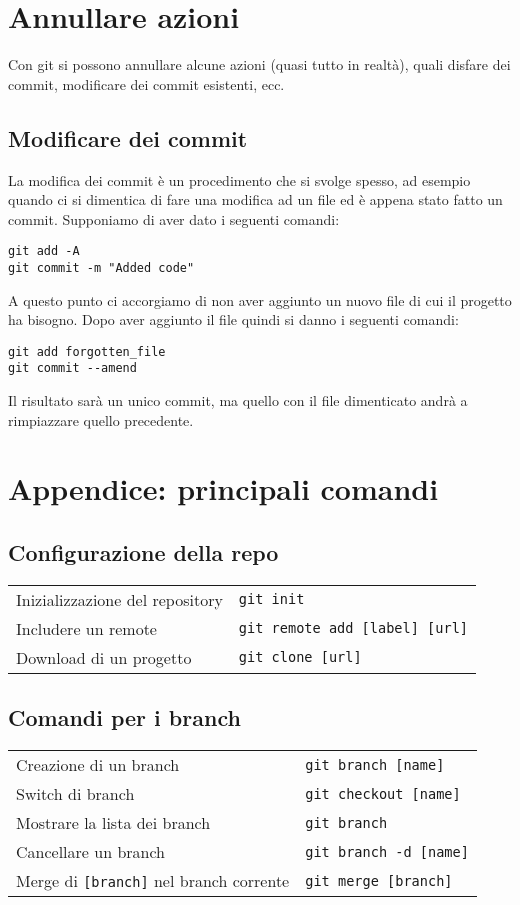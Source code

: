 \documentclass[a4paper, 11pt]{article}
\renewcommand{\headrulewidth}{0.4pt}
\begin{document}
	\section{Annullare azioni}
	Con git si possono annullare alcune azioni (quasi tutto in realtà), quali disfare dei commit, modificare dei commit esistenti, ecc.
	
	\subsection{Modificare dei commit}
	La modifica dei commit è un procedimento che si svolge spesso, ad esempio quando ci si dimentica di fare una modifica ad un file ed è appena stato fatto un commit. Supponiamo di aver dato i seguenti comandi: \begin{lstlisting}
git add -A
git commit -m "Added code"
	\end{lstlisting}
	
	A questo punto ci accorgiamo di non aver aggiunto un nuovo file di cui il progetto ha bisogno. Dopo aver aggiunto il file quindi si danno i seguenti comandi: \begin{lstlisting}
git add forgotten_file
git commit --amend
	\end{lstlisting}
	
	Il risultato sarà un unico commit, ma quello con il file dimenticato andrà a rimpiazzare quello precedente.
	\newpage
	\renewcommand{\headrulewidth}{0.4pt}
	\date{}

	\renewcommand{\arraystretch}{1.1}
		
		\section{Appendice: principali comandi}
		\subsection{Configurazione della repo}
		\begin{tabular}{p{9cm} p{6cm}}
			Inizializzazione del repository &\verb|git init| \\
			Includere un remote &\verb|git remote add [label] [url]| \\
			Download di un progetto &\verb|git clone [url]| \\
		\end{tabular}
		
		\subsection{Comandi per i branch}
		\begin{tabular}{p{9cm} p{6cm}}
			Creazione di un branch & \verb|git branch [name]| \\
			Switch di branch& \verb|git checkout [name]| \\
			Mostrare la lista dei branch & \verb|git branch| \\
			Cancellare un branch& \verb|git branch -d [name]| \\
			Merge di \verb|[branch]| nel branch corrente& \verb|git merge [branch]|
		\end{tabular}
		
\end{document}
